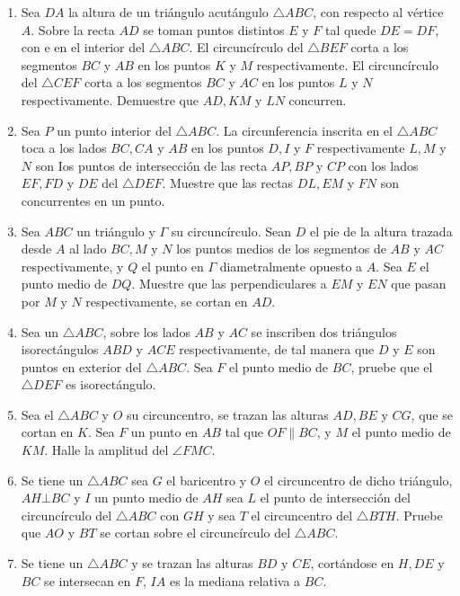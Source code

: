 \documentclass{book}
\begin{document}
\begin{enumerate}
 			\item Sea $DA$ la altura de un triángulo acutángulo $\triangle ABC$, con respecto al vértice $A$. Sobre la recta $AD$ se toman puntos distintos $E$ y $F$ tal quede $DE=DF$, con e en el interior del $\triangle ABC$. El circuncírculo del $\triangle BEF$ corta a los segmentos $BC$ y $AB$ en los puntos $K$ y $M$ respectivamente. El circuncírculo del $\triangle CEF$ corta a los segmentos $BC$ y $AC$ en los puntos $L$ y $N$ respectivamente. Demuestre que $AD, KM$ y $LN$ concurren. 
 			\item Sea $P$ un punto interior del $\triangle ABC$. La circunferencia inscrita en el $\triangle ABC$ toca a los lados $BC,CA$ y $AB$ en los puntos $D,I$ y $F$ respectivamente $L,M$ y $N$ son Ios puntos de intersección de las recta $AP,BP$ y $CP$ con los lados $EF,FD$ y $DE$ del $\triangle DEF$. Muestre que las rectas $DL,EM$ y $FN$ son concurrentes en un punto.
 			\item Sea $ABC$ un triángulo y $\Gamma$ su circuncírculo. Sean $D$ el pie de la altura trazada desde $A$ al lado $BC, M$ y $N$ los puntos medios de los segmentos de $AB$ y $AC$ respectivamente, y $Q$ el punto en $\Gamma$ diametralmente opuesto a $A$. Sea $E$ el punto medio de $DQ$. Muestre que las perpendiculares a $EM$ y $EN$ que pasan por $M$ y $N$ respectivamente, se cortan en $AD$.  
 			\item Sea un $\triangle ABC$, sobre los lados $AB$ y $AC$ se inscriben dos triángulos isorectángulos $ABD$ y $ACE$ respectivamente, de tal manera que $D$ y $E$ son puntos en exterior del $\triangle ABC$. Sea $F$ el punto medio de $BC$, pruebe que el $\triangle DEF$ es isorectángulo. 
 			\item Sea el $\triangle ABC$  y $O$ su circuncentro, se trazan las alturas $AD, BE$ y $CG$, que se cortan en $K$. Sea $F$ un punto en $AB$ tal que $OF \| BC$, y $M$ el punto medio de $KM$. Halle la amplitud del $\angle FMC$.  
 			\item Se tiene un $\triangle ABC$ sea $G$ el baricentro y $O$ el circuncentro de dicho triángulo, $AH \bot BC$ y $I$ un punto medio de $AH$ sea $L$ el punto de intersección del circuncírculo del $\triangle ABC$ con $GH$ y sea $T$ el circuncentro del $\triangle BTH$. Pruebe que $AO$ y $BT$ se cortan sobre el circuncírculo del $\triangle ABC$. 
 			\item Se tiene un $\triangle ABC$ y se trazan las alturas $BD$ y $CE$, cortándose en $H,DE$ y $BC$ se intersecan en $F$, $IA$ es la mediana relativa a $BC$. 
 				\begin{enumerate}

\end{enumerate}
\end{enumerate}
\end{document}
